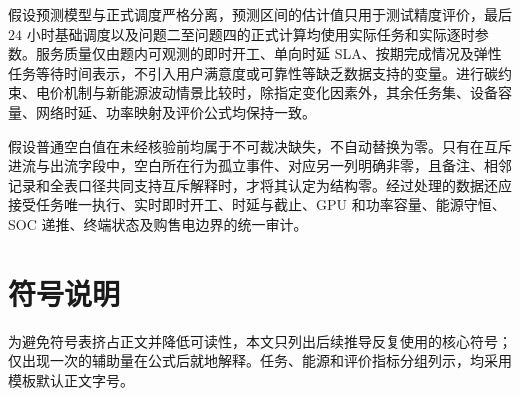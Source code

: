 \documentclass[withoutpreface,bwprint]{cumcmthesis}
\begin{document}
假设预测模型与正式调度严格分离，预测区间的估计值只用于测试精度评价，最后 $24$ 小时基础调度以及问题二至问题四的正式计算均使用实际任务和实际逐时参数。服务质量仅由题内可观测的即时开工、单向时延 SLA、按期完成情况及弹性任务等待时间表示，不引入用户满意度或可靠性等缺乏数据支持的变量。进行碳约束、电价机制与新能源波动情景比较时，除指定变化因素外，其余任务集、设备容量、网络时延、功率映射及评价公式均保持一致。

假设普通空白值在未经核验前均属于不可裁决缺失，不自动替换为零。只有在互斥进流与出流字段中，空白所在行为孤立事件、对应另一列明确非零，且备注、相邻记录和全表口径共同支持互斥解释时，才将其认定为结构零。经过处理的数据还应接受任务唯一执行、实时即时开工、时延与截止、GPU 和功率容量、能源守恒、SOC 递推、终端状态及购售电边界的统一审计。

\section{符号说明}
为避免符号表挤占正文并降低可读性，本文只列出后续推导反复使用的核心符号；仅出现一次的辅助量在公式后就地解释。任务、能源和评价指标分组列示，均采用模板默认正文字号。
\end{document}

